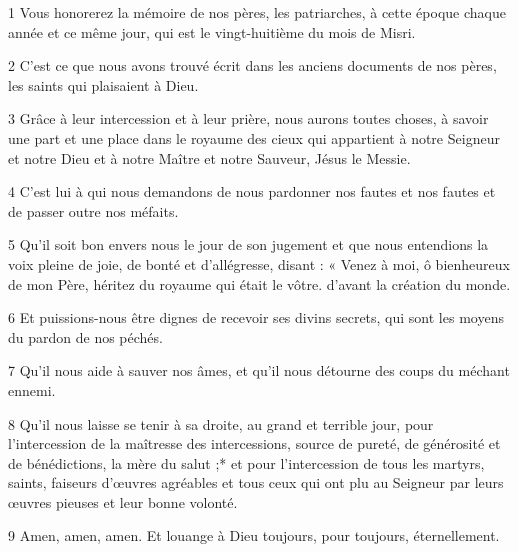 
\par 1 Vous honorerez la mémoire de nos pères, les patriarches, à cette époque chaque année et ce même jour, qui est le vingt-huitième du mois de Misri.

\par 2 C'est ce que nous avons trouvé écrit dans les anciens documents de nos pères, les saints qui plaisaient à Dieu.

\par 3 Grâce à leur intercession et à leur prière, nous aurons toutes choses, à savoir une part et une place dans le royaume des cieux qui appartient à notre Seigneur et notre Dieu et à notre Maître et notre Sauveur, Jésus le Messie.

\par 4 C'est lui à qui nous demandons de nous pardonner nos fautes et nos fautes et de passer outre nos méfaits.

\par 5 Qu'il soit bon envers nous le jour de son jugement et que nous entendions la voix pleine de joie, de bonté et d'allégresse, disant : « Venez à moi, ô bienheureux de mon Père, héritez du royaume qui était le vôtre. d'avant la création du monde.

\par 6 Et puissions-nous être dignes de recevoir ses divins secrets, qui sont les moyens du pardon de nos péchés.

\par 7 Qu'il nous aide à sauver nos âmes, et qu'il nous détourne des coups du méchant ennemi.

\par 8 Qu'il nous laisse se tenir à sa droite, au grand et terrible jour, pour l'intercession de la maîtresse des intercessions, source de pureté, de générosité et de bénédictions, la mère du salut ;* et pour l'intercession de tous les martyrs, saints, faiseurs d'œuvres agréables et tous ceux qui ont plu au Seigneur par leurs œuvres pieuses et leur bonne volonté.

\par 9 Amen, amen, amen. Et louange à Dieu toujours, pour toujours, éternellement.

